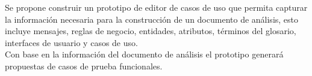 Se propone construir un prototipo de editor de casos de uso que permita capturar la información necesaria para la construcción de un documento de análisis, 
esto incluye mensajes, reglas de negocio, entidades, atributos, términos del glosario, interfaces de usuario y casos de uso.\\
Con base en la información del documento de análisis el prototipo generará propuestas de casos de prueba funcionales.
\vspace{1cm}




